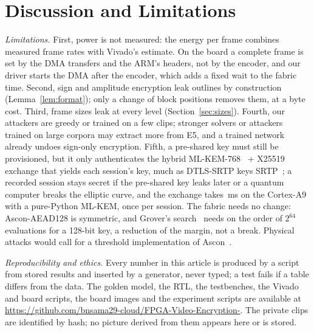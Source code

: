 \section{Discussion and Limitations}\label{sec:discussion}
\textit{Limitations.} First, power is not measured: the energy per frame combines measured frame rates with Vivado's estimate. On the board a complete frame is set by the DMA transfers and the ARM's headers, not by the encoder, and our driver starts the DMA after the encoder, which adds a fixed wait to the fabric time. Second, sign and amplitude encryption leak outlines by construction (Lemma~\ref{lem:format}); only a change of block positions removes them, at a byte cost. Third, frame sizes leak at every level (Section~\ref{sec:sizes}). Fourth, our attackers are greedy or trained on a few clips; stronger solvers or attackers trained on large corpora may extract more from E5, and a trained network already undoes sign-only encryption. Fifth, a pre-shared key must still be provisioned, but it only authenticates the hybrid ML-KEM-768~\cite{fips203} + X25519 exchange that yields each session's key, much as DTLS-SRTP keys SRTP~\cite{rfc3711}; a recorded session stays secret if the pre-shared key leaks later or a quantum computer breaks the elliptic curve, and the exchange takes \BdKexMs\,ms on the Cortex-A9 with a pure-Python ML-KEM, once per session. The fabric needs no change: Ascon-AEAD128 is symmetric, and Grover's search~\cite{grover1996} needs on the order of $2^{64}$ evaluations for a 128-bit key, a reduction of the margin, not a break. Physical attacks would call for a threshold implementation of Ascon~\cite{gross2017}.

\textit{Reproducibility and ethics.} Every number in this article is produced by a script from stored results and inserted by a generator, never typed; a test fails if a table differs from the data. The golden model, the RTL, the testbenches, the Vivado and board scripts, the board images and the experiment scripts are available at \url{https://github.com/bnsama29-cloud/FPGA-Video-Encryption-}. The private clips are identified by hash; no picture derived from them appears here or is stored.

